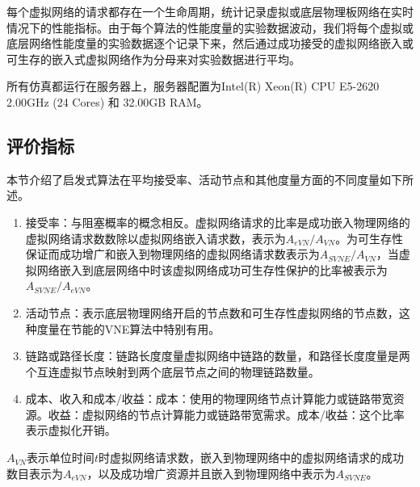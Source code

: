 每个虚拟网络的请求都存在一个生命周期，统计记录虚拟或底层物理板网络在实时情况下的性能指标。由于每个算法的性能度量的实验数据波动，我们将每个虚拟或底层网络性能度量的实验数据逐个记录下来，然后通过成功接受的虚拟网络嵌入或可生存的嵌入式虚拟网络作为分母来对实验数据进行平均。

所有仿真都运行在服务器上，服务器配置为Intel(R) Xeon(R) CPU E5-2620 2.00GHz (24 Cores) 和 32.00GB RAM。
\subsection{评价指标}
本节介绍了启发式算法在平均接受率、活动节点和其他度量方面的不同度量\cite{fischer2013virtual}如下所述。
\begin{enumerate}
  \item 接受率：与阻塞概率的概念相反。虚拟网络请求的比率是成功嵌入物理网络的虚拟网络请求数数除以虚拟网络嵌入请求数，表示为$A_{eVN}/A_{VN}$。为可生存性保证而成功增广和嵌入到物理网络的虚拟网络请求数表示为$A_{SVNE}/A_{VN}$，当虚拟网络嵌入到底层网络中时该虚拟网络成功可生存性保护的比率被表示为$A_{SVNE}/A_{eVN}$。
  \item 活动节点：表示底层物理网络开启的节点数和可生存性虚拟网络的节点数，这种度量在节能的VNE算法中特别有用。
  \item 链路或路径长度：链路长度度量虚拟网络中链路的数量，和路径长度度量是两个互连虚拟节点映射到两个底层节点之间的物理链路数量。
  \item 成本、收入和成本/收益：成本：使用的物理网络节点计算能力或链路带宽资源。收益：虚拟网络的节点计算能力或链路带宽需求。成本/收益：这个比率表示虚拟化开销。
\end{enumerate}

$A_{VN}$表示单位时间$t$时虚拟网络请求数，嵌入到物理网络中的虚拟网络请求的成功数目表示为$A_{eVN}$，以及成功增广资源并且嵌入到物理网络中表示为$A_{SVNE}$。

